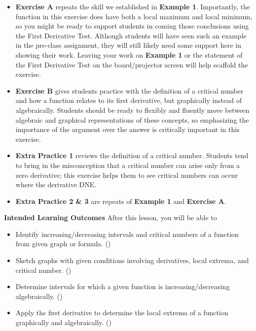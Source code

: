\documentclass[10pt]{article}
\newcounter{example}[section]
\newcounter{exercise}[section]
\begin{document}
\begin{itemize}
\begin{itemize}
    \item In part (c), we need to model how students should write their answers. Stating the conclusion by directly invoking the statement of the First Derivative Test helps model how conclusions in mathematics are directly connected to established facts, so you might say something like ``$g'$ does not change signs at the critical number $x=1$, so $g$ has neither a local maximum nor local minimum there by the First Derivative Test."
    \end{itemize} 
\item {\bf\color{blue} Exercise A} repeats the skill we established in {\bf\color{blue}Example 1}. Importantly, the function in this exercise does have both a local maximum and local minimum, so you might be ready to support students in coming those conclusions using the First Derivative Test. Although students will have seen such an example in the pre-class assignment, they will still likely need some support here in showing their work. Leaving your work on {\bf\color{blue}Example 1} or the statement of the First Derivative Test on the board/projector screen will help scaffold the exercise.
\item {\bf\color{blue} Exercise B} gives students practice with the definition of a critical number and how a function relates to its first derivative, but graphically instead of algebraically. Students should be ready to flexibly and fluently move between algebraic and graphical representations of these concepts, so emphasizing the importance of the argument over the answer is critically important in this exercise.
\item {\bf\color{blue} Extra Practice 1} reviews the definition of a critical number. Students tend to bring in the misconception that a critical number can arise only from a zero derivative; this exercise helps them to see critical numbers can occur where the derivative DNE.
\item {\bf\color{blue} Extra Practice 2 \& 3} are repeats of {\bf\color{blue}Example 1} and {\bf\color{blue}Exercise A}.
\end{itemize}

\newpage%

\pagestyle{otherpages}
\thispagestyle{firstpage}

\textbf{Intended Learning Outcomes}
After this lesson, you will be able to 

\begin{itemize}
    \item Identify increasing/decreasing intervals and critical numbers of a function from given graph or formula. ()
    \item Sketch graphs with given conditions involving derivatives, local extrema, and critical number. ()
    \item Determine intervals for which a given function is increasing/decreasing algebraically. ()
    \item Apply the first derivative to determine the local extrema of a function graphically and algebraically. ()
\end{itemize}
\end{document}
